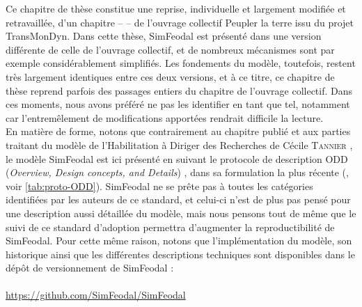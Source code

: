 \begin{mdframed}[backgroundcolor=gray!10,footnoteinside=false]
\begin{multicols}{2}
\begin{itemize}
\end{itemize}
Ce chapitre de thèse constitue une reprise, individuelle et largement modifiée et retravaillée, d'un chapitre --  \autocite{cura_transition_2017} -- de l'ouvrage collectif \og Peupler la terre\fg{} \autocite{sanders2018peupler} issu du projet TransMonDyn\footnotemark.
Dans cette thèse, SimFeodal est présenté dans une version différente de celle de l'ouvrage collectif, et de nombreux mécanismes sont par exemple considérablement simplifiés.
Les fondements du modèle, toutefois, restent très largement identiques entre ces deux versions, et à ce titre, ce chapitre de thèse reprend parfois des passages entiers du chapitre de l'ouvrage collectif.
Dans ces moments, nous avons préféré ne pas les identifier en tant que tel, notamment car l'entremêlement de modifications apportées rendrait difficile la lecture.\\
En matière de forme, notons que contrairement au chapitre publié et aux parties traitant du modèle de l'Habilitation à Diriger des Recherches de Cécile \textsc{Tannier} \autocite{tannier_analyse_2017}, le modèle SimFeodal est ici présenté en suivant le protocole de description \og ODD\fg{} (\textit{Overview, Design concepts, and Details}) \autocite{grimm_odd_2010}, dans sa formulation la plus récente (\cite{grimm_documenting_2017}, voir \cref{tab:proto-ODD}).
SimFeodal ne se prête pas à toutes les catégories identifiées par les auteurs de ce standard, et celui-ci n'est de plus pas pensé pour une description aussi détaillée du modèle\footnotemark, mais nous pensons tout de même que le suivi de ce standard d'adoption permettra d'augmenter la reproductibilité de SimFeodal.
Pour cette même raison, notons que l'implémentation du modèle, son historique ainsi que les différentes descriptions techniques sont disponibles dans le dépôt de versionnement de SimFeodal :\\ \\
\footnotesize
\href{https://github.com/SimFeodal/SimFeodal}{https://github.com/SimFeodal/SimFeodal}

\end{multicols}

\end{mdframed}



